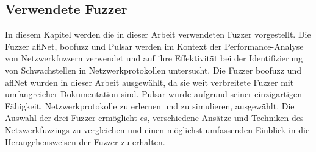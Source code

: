 \subsection{Verwendete Fuzzer}\label{subsec:verwendete-fuzzer}
In diesem Kapitel werden die in dieser Arbeit verwendeten Fuzzer vorgestellt.
Die Fuzzer \gls{afl}Net, boofuzz und Pulsar werden im Kontext der Performance-Analyse von Netzwerkfuzzern
verwendet und auf ihre Effektivität bei der Identifizierung von Schwachstellen in Netzwerkprotokollen untersucht.
Die Fuzzer boofuzz und \gls{afl}Net wurden in dieser Arbeit ausgewählt, da sie weit verbreitete Fuzzer mit umfangreicher
Dokumentation sind.
Pulsar wurde aufgrund seiner einzigartigen Fähigkeit, Netzwerkprotokolle zu erlernen und zu simulieren, ausgewählt.
Die Auswahl der drei Fuzzer ermöglicht es, verschiedene Ansätze und Techniken des Netzwerkfuzzings zu vergleichen und
einen möglichst umfassenden Einblick in die Herangehensweisen der Fuzzer zu erhalten.

